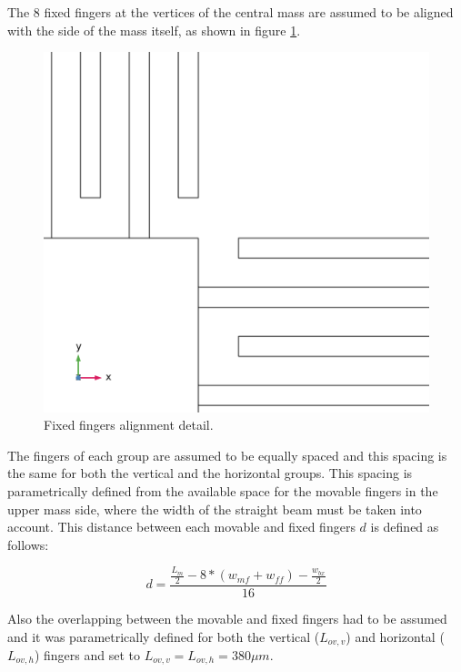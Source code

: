 \documentclass[lettersize,journal]{IEEEtran}
\begin{document}
        The 8 fixed fingers at the vertices of the central mass are assumed to be aligned with the side of the mass itself, as shown in figure \ref{fig:ff-detail}.
        
        \begin{figure}
            \centering
            \includegraphics[width=1.0\linewidth]{device_ff_detail.png}
            \caption{Fixed fingers alignment detail.}
            \label{fig:ff-detail}
        \end{figure}
        
        The fingers of each group are assumed to be equally spaced and this spacing is the same for both the vertical and the horizontal groups. This spacing is parametrically defined from the available space for the movable fingers in the upper mass side, where the width of the straight beam must be taken into account. This distance between each movable and fixed fingers \(d\) is defined as follows:
        
        \begin{equation}
            d = \frac{\frac{L_m}{2}-8*(w_{mf}+w_{ff})-\frac{w_{bx}}{2}}{16}
        \end{equation}
        
        Also the overlapping between the movable and fixed fingers had to be assumed and it was parametrically defined for both the vertical (\(L_{ov,v}\)) and horizontal (\(L_{ov,h}\)) fingers and set to \(L_{ov,v}=L_{ov,h}=380\mu m\).
        
\end{document}

